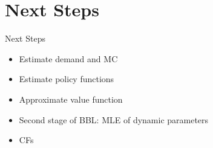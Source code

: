 \documentclass[xcolor=dvipsnames,envcountsect]{beamer}
\begin{document}

\section{Next Steps}
\begin{frame}{Next Steps}
    \begin{itemize}
        \item Estimate demand and MC
        \item Estimate policy functions
        \item Approximate value function
        \item Second stage of BBL: MLE of dynamic parameters
        \item CFs
    \end{itemize}
\end{frame}
\end{document}
